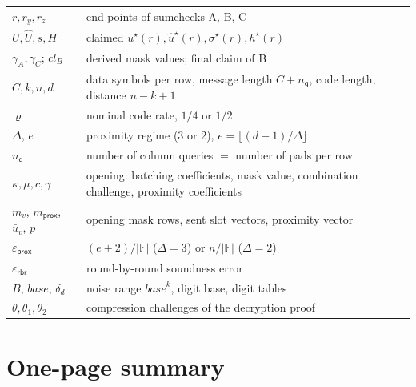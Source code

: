 \documentclass[11pt,a4paper]{article}
\newcommand{\F}{\mathbb{F}}
\newcommand{\msk}[1]{#1^{\star}}
\newcommand{\epsprox}{\varepsilon_{\mathsf{prox}}}
\newcommand{\epsrbr}{\varepsilon_{\mathsf{rbr}}}
\newcommand{\nq}{n_{\mathsf{q}}}
\newcommand{\uh}{\hat{u}}
\theoremstyle{definition}
\theoremstyle{plain}
\begin{document}
\begin{longtable}{@{}p{}p{}@{}}
$r,r_y,r_z$ & end points of sumchecks A, B, C\\
$U,\hat U,s,H$ & claimed $\msk u(r),\msk\uh(r),\msk\sigma(r),\msk h(r)$\\
$\gamma_A,\gamma_C$; $\mathit{cl}_B$ & derived mask values; final claim of B\\
$C,k,n,d$ & data symbols per row, message length $C+\nq$, code length, distance $n-k+1$\\
$\varrho$ & nominal code rate, $1/4$ or $1/2$\\
$\Delta$, $e$ & proximity regime (3 or 2), $e=\lfloor(d-1)/\Delta\rfloor$\\
$\nq$ & number of column queries $=$ number of pads per row\\
$\kappa,\mu,c,\gamma$ & opening: batching coefficients, mask value, combination challenge, proximity coefficients\\
$m_v$, $m_{\mathsf{prox}}$, $\bar u_v$, $p$ & opening mask rows, sent slot vectors, proximity vector\\
$\epsprox$ & $(e+2)/|\F|$ ($\Delta=3$) or $n/|\F|$ ($\Delta=2$)\\
$\epsrbr$ & round-by-round soundness error\\
$B$, $\mathit{base}$, $\delta_d$ & noise range $\mathit{base}^k$, digit base, digit tables\\
$\theta,\theta_1,\theta_2$ & compression challenges of the decryption proof\\
\bottomrule
\end{longtable}

\section*{One-page summary}
\end{document}
